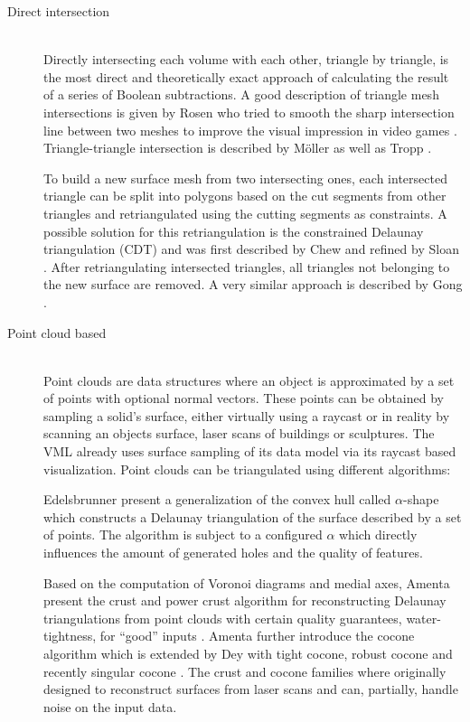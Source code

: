 \begin{description}
	\item[Direct intersection] \hfill \\
	Directly intersecting each volume with each other, triangle by triangle, is the most direct and theoretically exact approach of calculating the result of a series of Boolean subtractions.
	A good description of triangle mesh intersections is given by Rosen who tried to smooth the sharp intersection line between two meshes to improve the visual impression in video games \cite{mesh_intersection}.
	Triangle-triangle intersection is described by Möller \cite{tri_tri_intersection_moller} as well as Tropp \etal \cite{tri_tri_intersection_2}.

	To build a new surface mesh from two intersecting ones, each intersected triangle can be split into polygons based on the cut segments from other triangles and retriangulated using the cutting segments as constraints.
	A possible solution for this retriangulation is the constrained Delaunay triangulation (CDT) and was first described by Chew \cite{cdt} and refined by Sloan \cite{cdt_fast}.
	After retriangulating intersected triangles, all triangles not belonging to the new surface are removed.
	A very similar approach is described by Gong \cite{cutter_workpiece_engagement}.


	\item[Point cloud based] \hfill \\
	Point clouds are data structures where an object is approximated by a set of points with optional normal vectors.
	These points can be obtained \eg by sampling a solid's surface, either virtually using a raycast or in reality by scanning an objects surface, \eg laser scans of buildings or sculptures.
	The VML already uses surface sampling of its data model via its raycast based visualization.
	Point clouds can be triangulated using different algorithms:

	Edelsbrunner \etal present a generalization of the convex hull called $\alpha$-shape \cite{alpha_shape} which constructs a Delaunay triangulation of the surface described by a set of points.
	The algorithm is subject to a configured $\alpha$ which directly influences the amount of generated holes and the quality of features.

	Based on the computation of Voronoi diagrams and medial axes, Amenta \etal present the crust and power crust algorithm for reconstructing Delaunay triangulations from point clouds with certain quality guarantees, \eg water-tightness, for \enquote{good} inputs \cite{crust, power_crust}.
	Amenta \etal further introduce the cocone algorithm \cite{cocone} which is extended by Dey \etal with tight cocone, robust cocone and recently singular cocone \cite{tight_cocone, robust_cocone, singular_cocone}.
	The crust and cocone families where originally designed to reconstruct surfaces from laser scans and can, partially, handle noise on the input data.


\end{description}
